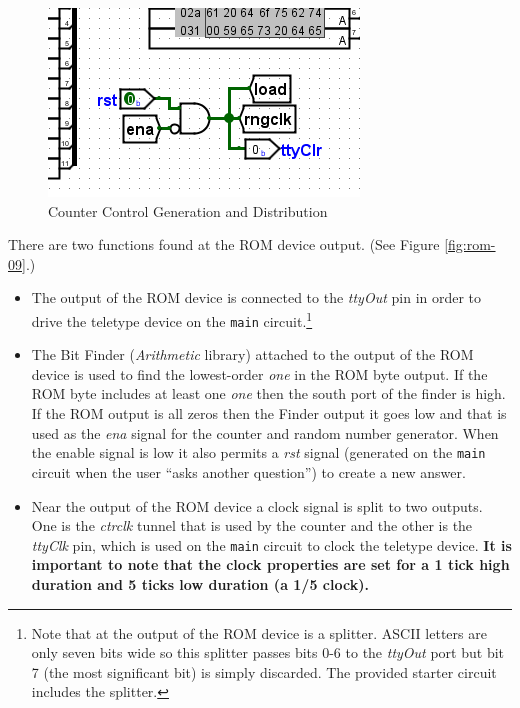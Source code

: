 \begin{figure}[H]
	\centering
	\includegraphics[width=\maxwidth{.95\linewidth}]{gfx/rom-08}
	\caption{Counter Control Generation and Distribution}
	\label{fig:rom-08}
\end{figure}

There are two functions found at the ROM device output. (See Figure \ref{fig:rom-09}.)

\begin{itemize}
	\item The output of the ROM device is connected to the \textit{ttyOut} pin in order to drive the teletype device on the \lstinline[columns=fixed]|main| circuit.\footnote{Note that at the output of the ROM device is a splitter. ASCII letters are only seven bits wide so this splitter passes bits 0-6 to the \textit{ttyOut} port but bit 7 (the most significant bit) is simply discarded. The provided starter circuit includes the splitter.}

	\item The Bit Finder (\textit{Arithmetic} library) attached to the output of the ROM device is used to find the lowest-order \textit{one} in the ROM byte output. If the ROM byte includes at least one \textit{one} then the south port of the finder is high. If the ROM output is all zeros then the Finder output it goes low and that is used as the \textit{ena} signal for the counter and random number generator. When the enable signal is low it also permits a \textit{rst} signal (generated on the \lstinline[columns=fixed]|main| circuit when the user ``asks another question'') to create a new answer.
	
	\item Near the output of the ROM device a clock signal is split to two outputs. One is the \textit{ctrclk} tunnel that is used by the counter and the other is the \textit{ttyClk} pin, which is used on the \lstinline[columns=fixed]|main| circuit to clock the teletype device. \textbf{It is important to note that the clock properties are set for a 1 tick high duration and 5 ticks low duration (a 1/5 clock).}
\end{itemize}

